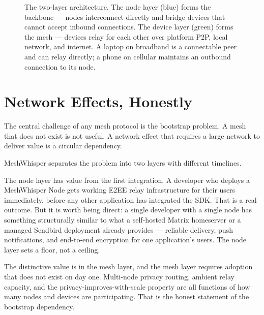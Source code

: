 \documentclass[11pt, a4paper]{article}
\begin{document}
\begin{figure}[h]
\caption{The two-layer architecture. The node layer (blue) forms the backbone — nodes interconnect directly and bridge devices that cannot accept inbound connections. The device layer (green) forms the mesh — devices relay for each other over platform P2P, local network, and internet. A laptop on broadband is a connectable peer and can relay directly; a phone on cellular maintains an outbound connection to its node.}
\label{fig:layers}
\end{figure}

\section{Network Effects, Honestly}

The central challenge of any mesh protocol is the bootstrap problem. A mesh that does not exist is not useful. A network effect that requires a large network to deliver value is a circular dependency.

MeshWhisper separates the problem into two layers with different timelines.

The node layer has value from the first integration. A developer who deploys a MeshWhisper Node gets working E2EE relay infrastructure for their users immediately, before any other application has integrated the SDK. That is a real outcome. But it is worth being direct: a single developer with a single node has something structurally similar to what a self-hosted Matrix homeserver or a managed Sendbird deployment already provides — reliable delivery, push notifications, and end-to-end encryption for one application's users. The node layer sets a floor, not a ceiling.

The distinctive value is in the mesh layer, and the mesh layer requires adoption that does not exist on day one. Multi-node privacy routing, ambient relay capacity, and the privacy-improves-with-scale property are all functions of how many nodes and devices are participating. That is the honest statement of the bootstrap dependency.
\end{document}
